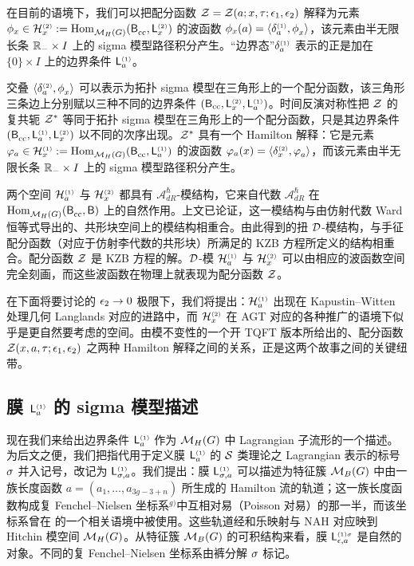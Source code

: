 在目前的语境下，我们可以把配分函数 $\mathcal{Z}=\mathcal{Z}(a;x,\tau;\epsilon_1,\epsilon_2)$ 解释为元素 $\phi_x\in \mathcal{H}_{x}^{\scriptscriptstyle(2)}:=
{\rm Hom}_{\mathcal{M}_H(G)}^{}(\mathsf{B}_{\rm cc}^{},\mathsf{L}_{x}^{\scriptscriptstyle(2)})$ 的波函数 $\phi_x(a)=\langle\delta_a^{\scriptscriptstyle(1)},\phi_x^{}\rangle$，该元素由半无限长条 $\mathbb{R}_-\times I$ 上的 sigma 模型路径积分产生。“边界态”$\delta_a^{\scriptscriptstyle(1)}$ 表示的正是加在 $\{0\}\times I$ 上的边界条件 $\mathsf{L}_{a}^{\scriptscriptstyle(1)}$。

交叠 $\langle\delta_a^{\scriptscriptstyle(2)},\phi_x^{}\rangle$ 可以表示为拓扑 sigma 模型在三角形上的一个配分函数，该三角形三条边上分别赋以三种不同的边界条件 $(\mathsf{B}_{\rm cc},\mathsf{L}_{x}^{\scriptscriptstyle(2)},\mathsf{L}_{a}^{\scriptscriptstyle(1)})$。时间反演对称性把 $\mathcal{Z}$ 的复共轭 $\mathcal{Z}^*$ 等同于拓扑 sigma 模型在三角形上的一个配分函数，只是其边界条件 $(\mathsf{B}_{\rm cc}^{},\mathsf{L}_{a}^{\scriptscriptstyle(1)},\mathsf{L}_{x}^{\scriptscriptstyle(2)})$ 以不同的次序出现。$\mathcal{Z}^*$ 具有一个 Hamilton 解释：它是元素 $\varphi_a\in \mathcal{H}_{x}^{\scriptscriptstyle(1)}:=
{\rm Hom}_{\mathcal{M}_H(G)}^{}(\mathsf{B}_{\rm cc}^{},\mathsf{L}_{a}^{\scriptscriptstyle(1)})$ 的波函数 $\varphi_a(x)=\langle\delta_x^{\scriptscriptstyle(2)},\varphi_a^{}\rangle$，而该元素由半无限长条 $\mathbb{R}_-\times I$ 上的 sigma 模型路径积分产生。

两个空间 $\mathcal{H}_{a}^{\scriptscriptstyle(1)}$ 与 $\mathcal{H}_{x}^{\scriptscriptstyle(2)}$ 都具有 $\mathcal{A}_{dR}^{\hbar}$-模结构，它来自代数 $\mathcal{A}_{dR}^{\hbar}$ 在 ${\rm Hom}_{\mathcal{M}_H(G)}^{}(\mathsf{B}_{\rm cc}^{},\mathsf{B})$ 上的自然作用。上文已论证，这一模结构与由仿射代数 Ward 恒等式导出的、共形块空间上的模结构相重合。由此得到的扭 $\mathcal{D}$-模结构，与手征配分函数（对应于仿射李代数的共形块）所满足的 KZB 方程所定义的结构相重合。配分函数 $\mathcal{Z}$ 是 KZB 方程的解。$\mathcal{D}$-模 $\mathcal{H}_{a}^{\scriptscriptstyle(1)}$ 与 $\mathcal{H}_{x}^{\scriptscriptstyle(2)}$ 可以由相应的波函数空间完全刻画，而这些波函数在物理上就表现为配分函数 $\mathcal{Z}$。

在下面将要讨论的 $\epsilon_2\to 0$ 极限下，我们将提出：$\mathcal{H}_{{a}}^{\scriptscriptstyle (1)}$ 出现在 Kapustin--Witten 处理几何 Langlands 对应的进路中，而 $\mathcal{H}_x^{\scriptscriptstyle(2)}$ 在 AGT 对应的各种推广的语境下似乎是更自然要考虑的空间。由模不变性的一个开 TQFT 版本所给出的、配分函数 $\mathcal{Z}(x,{a},\tau;\epsilon_1,\epsilon_2)$ 之两种 Hamilton 解释之间的关系，正是这两个故事之间的关键纽带。

\subsection{膜 $\mathsf{L}_{a}^{\scriptscriptstyle (1)}$ 的 sigma 模型描述}\label{branes1}

现在我们来给出边界条件 $\mathsf{L}_{a}^{\scriptscriptstyle(1)}$ 作为 $\mathcal{M}_H(G)$ 中 Lagrangian 子流形的一个描述。为后文之便，我们把指代用于定义膜 $\mathsf{L}_{a}^{\scriptscriptstyle(1)}$ 的 $\mathcal{S}$ 类理论之 Lagrangian 表示的标号 $\sigma$ 并入记号，改记为 $\mathsf{L}_{\sigma,a}^{\scriptscriptstyle(1)}$。我们提出：膜 $\mathsf{L}_{\sigma,a}^{\scriptscriptstyle(1)}$ 可以描述为特征簇 $\mathcal{M}_B(G)$ 中由一族长度函数 $a=(a_1,\dots,a_{3g-3+n})$ 所生成的 Hamilton 流的轨道；这一族长度函数构成复 Fenchel--Nielsen 坐标系{$^{g)}$}中互相对易（Poisson 对易）的那一半，而该坐标系曾在 \cite{NRS} 的一个相关语境中被使用。这些轨道经和乐映射与 NAH 对应映到 Hitchin 模空间 $\mathcal{M}_H(G)$。从特征簇 $\mathcal{M}_B(G)$ 的可积结构来看，膜 $\mathsf{L}_{{\epsilon},a}^{\scriptscriptstyle(1)\sigma}$ 是自然的对象。不同的复 Fenchel--Nielsen 坐标系由裤分解 $\sigma$ 标记。

